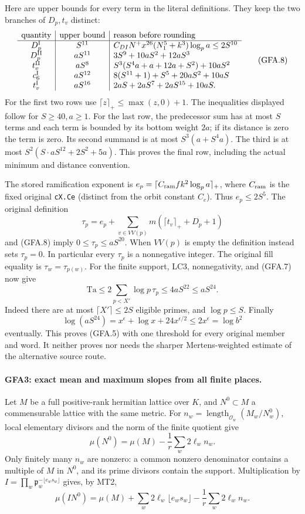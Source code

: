 Here are upper bounds for every term in the literal definitions.
They keep the two branches of $D_p,t_v$ distinct:
\[
\begin{array}{c|c|l}
\text{quantity}&\text{upper bound}&\text{reason before rounding}\\\hline
 D^{\rm I}_p&S^{11}&
 C_{DI}N^+x^{26}(N_1^5+k^3)\log_pa\le2S^{10}\\
 D^{\rm II}_p&aS^{11}&
 3S^9+10aS^2+12aS^3\\
 t^{\rm II}_v&aS^8&
 S^3(S^4a+a+12a+S^2)+10aS^2\\
 c_6^{\rm I}&aS^{12}&
 8(S^{11}+1)+S^5+20aS^2+10aS\\
 t^{\rm I}_v&aS^{16}&
 2aS+2aS^7+2aS^{15}+10aS .
\end{array}                                                  \tag{GFA.8}
\]
For the first two rows use $\lceil z\rceil_+\le\max(z,0)+1$.
The inequalities displayed follow for $S\ge40,a\ge1$.
For the last row, the predecessor sum has at most $S$ terms and
each term is bounded by its bottom weight $2a$; if its distance
is zero the term is zero.  Its second summand is at most
$S^3(a+S^4a)$.  The third is at most
$S^2(S\cdot aS^{12}+2S^2+5a)$.  This proves the final row,
including the actual minimum and distance convention.

The stored ramification exponent is
$e_p=\lceil C_{\rm ram} f k^2\log_pa\rceil_+$, where
$C_{\rm ram}$ is the fixed original \texttt{cX.Ce} (distinct
from the orbit constant $C_e$).  Thus $e_p\le2S^5$.
The original definition
\[
 \tau_p=e_p+\sum_{v\in VV(p)}m(\lceil t_v\rceil_++D_p+1)
\]
and (GFA.8) imply $0\le\tau_p\le aS^{20}$.  When $VV(p)$
is empty the definition instead sets $\tau_p=0$.
In particular every $\tau_p$ is a nonnegative integer.
The original fill equality is $\tau_w=\tau_{p(w)}$.
For the finite support, LC3, nonnegativity, and (GFA.7) now give
\[
 \mathrm{Ta}\le2\sum_{p<X'}\log p\,\tau_p
 \le4aS^{22}\le aS^{24}.
\]
Indeed there are at most $\lceil X'\rceil\le2S$ eligible primes,
and $\log p\le S$.  Finally
\[
 \log(aS^{24})=x^\epsilon+\log x+24x^{\epsilon/2}
 \le2x^\epsilon=\log b^2
\]
eventually.  This proves (GFA.5) with one threshold for every
original member and word.  It neither proves nor needs the
sharper Mertens-weighted estimate of the alternative source route.

\paragraph{GFA3: exact mean and maximum slopes from all finite places.}
\label{claim:GFA3}
Let $M$ be a full positive-rank hermitian lattice over $K$, and
$N^0\subset M$ a commensurable lattice with the same metric.
For $n_w=\operatorname{length}_{\mathcal O_w}(M_w/N_w^0)$,
local elementary divisors and the norm of the finite quotient give
\[
 \mu(N^0)=\mu(M)-\frac1r\sum_w2\ell_wn_w.                  \tag{GFA.9}
\]
Only finitely many $n_w$ are nonzero: a common nonzero denominator
contains a multiple of $M$ in $N^0$, and its prime divisors contain
the support.  Multiplication by
$I=\prod_w\mathfrak p_w^{-\lfloor e_ws_w\rfloor}$ gives, by MT2,
\[
 \mu(IN^0)=\mu(M)+\sum_w2\ell_w\lfloor e_ws_w\rfloor
                     -\frac1r\sum_w2\ell_wn_w.              \tag{GFA.10}
\]

